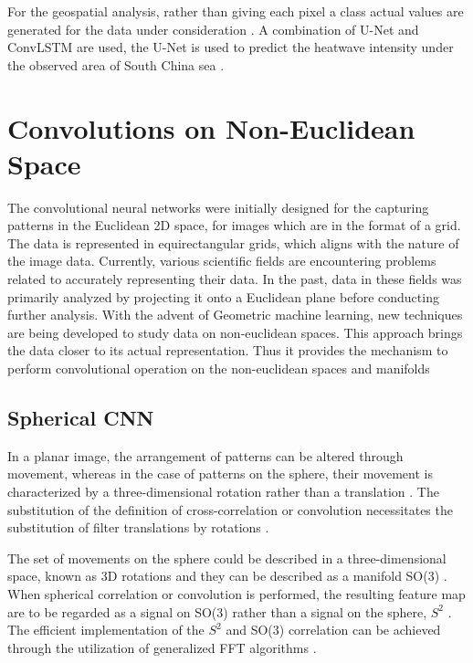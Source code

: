 For the geospatial analysis, rather than giving each pixel a class actual values are generated for the data under consideration \cite{trebing2021smaatunet}. A combination of U-Net and ConvLSTM are used, the U-Net is used to predict the heatwave intensity under the observed area of South China sea \cite{rs15164068}.

\newpage
\section{Convolutions on Non-Euclidean Space}
The convolutional neural networks were initially designed for the capturing patterns in the Euclidean 2D space, for images which are in the format of a grid. The data is represented in equirectangular grids, which aligns with the nature of the image data.
Currently, various scientific fields are encountering problems related to accurately representing their data. In the past, data in these fields was primarily analyzed by projecting it onto a Euclidean plane before conducting further analysis.
With the advent of Geometric machine learning, new techniques are being developed to study data on non-euclidean spaces. This approach brings the data closer to its actual representation.
Thus it provides the mechanism to perform convolutional operation on the non-euclidean spaces and manifolds

\subsection{Spherical CNN}

In a planar image, the arrangement of patterns can be altered through movement, whereas in the case of patterns on the sphere, their movement is characterized by a three-dimensional rotation rather than a translation \cite{cohen2018spherical}.
The substitution of the definition of cross-correlation or convolution necessitates the substitution of filter translations by rotations \cite{cohen2018spherical}.

The set of movements on the sphere could be described in a three-dimensional space, known as 3D rotations and they can be described as a manifold SO(3) \cite{cohen2018spherical}. When spherical correlation or convolution is performed, the resulting feature map are to be regarded as a signal on SO(3) rather than a signal on the sphere, $S^2$ \cite{cohen2018spherical}.
The efficient implementation of the $S^2$ and SO(3) correlation can be achieved through the utilization of generalized FFT algorithms \cite{cohen2018spherical}.


